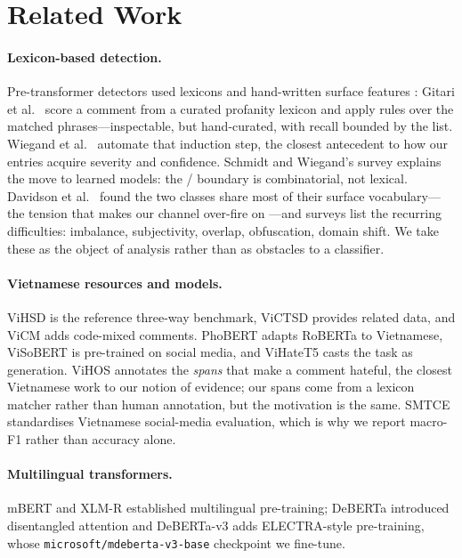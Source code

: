 \section{Related Work}
\label{sec:related}

\paragraph{Lexicon-based detection.}
Pre-transformer detectors used lexicons and hand-written surface features
\cite{waseem2016hateful}: Gitari et al.\ \cite{gitari2015lexicon} score a comment
from a curated profanity lexicon and apply rules over the matched phrases---inspectable,
but hand-curated, with recall bounded by the list. Wiegand et al.\
\cite{wiegand2018inducing} automate that induction step, the closest antecedent to how
our entries acquire severity and confidence. Schmidt and Wiegand's survey
\cite{schmidt2017survey} explains the move to learned models: the \hate{}/\off{}
boundary is combinatorial, not lexical. Davidson et al.\ \cite{davidson2017automated}
found the two classes share most of their surface vocabulary---the tension that makes
our channel over-fire on \off{}---and surveys \cite{fortuna2018survey} list the
recurring difficulties: imbalance, subjectivity, overlap, obfuscation, domain shift.
We take these as the object of analysis rather than as obstacles to a classifier.

\paragraph{Vietnamese resources and models.}
ViHSD \cite{luu2021vihsd} is the reference three-way benchmark, ViCTSD
\cite{nguyen2021victsd} provides related data, and ViCM \cite{nguyen2026vicm} adds
code-mixed comments. PhoBERT \cite{nguyen2020phobert}
adapts RoBERTa to Vietnamese, ViSoBERT \cite{nguyen2023visobert} is pre-trained on
social media, and ViHateT5 \cite{nguyen2024vihatet5} casts the task as generation.
ViHOS \cite{hoang2023vihos} annotates the \emph{spans} that make a comment hateful,
the closest Vietnamese work to our notion of evidence; our spans come from a lexicon
matcher rather than human annotation, but the motivation is the same. SMTCE
\cite{nguyen2022smtce} standardises Vietnamese social-media evaluation, which is why we
report macro-F1 rather than accuracy alone.

\paragraph{Multilingual transformers.}
mBERT \cite{devlin2019bert} and XLM-R \cite{conneau2020xlmr} established multilingual
pre-training; DeBERTa \cite{he2021deberta} introduced disentangled attention and
DeBERTa-v3 \cite{he2023debertav3} adds ELECTRA-style pre-training, whose
\texttt{microsoft/\allowbreak mdeberta-v3-base} checkpoint \cite{liu2024mdeberta} we
fine-tune.

